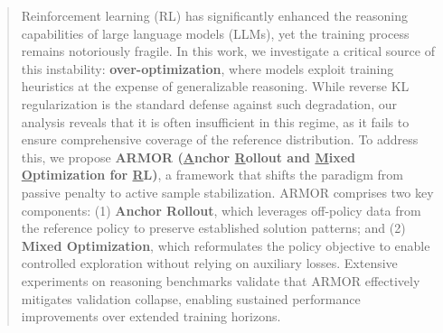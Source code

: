 \begin{abstract}
Reinforcement learning (RL) has significantly enhanced the reasoning capabilities of large language models (LLMs), yet the training process remains notoriously fragile. 
In this work, we investigate a critical source of this instability: \textbf{over-optimization}, where models exploit training heuristics at the expense of generalizable reasoning. 
While reverse KL regularization is the standard defense against such degradation, our analysis reveals that it is often insufficient in this regime, as it fails to ensure comprehensive coverage of the reference distribution. %
To address this, we propose \textbf{ARMOR ({\ul A}nchor {\ul R}ollout and {\ul M}ixed {\ul O}ptimization for {\ul R}L)}, a framework that shifts the paradigm from passive penalty to active sample stabilization. 
ARMOR comprises two key components: 
(1) \textbf{Anchor Rollout}, which leverages off-policy data from the reference policy to preserve established solution patterns; 
and (2) \textbf{Mixed Optimization}, which reformulates the policy objective to enable controlled exploration without relying on auxiliary losses. 
Extensive experiments on reasoning benchmarks validate that ARMOR effectively mitigates validation collapse, enabling sustained performance improvements over extended training horizons.
\end{abstract}
